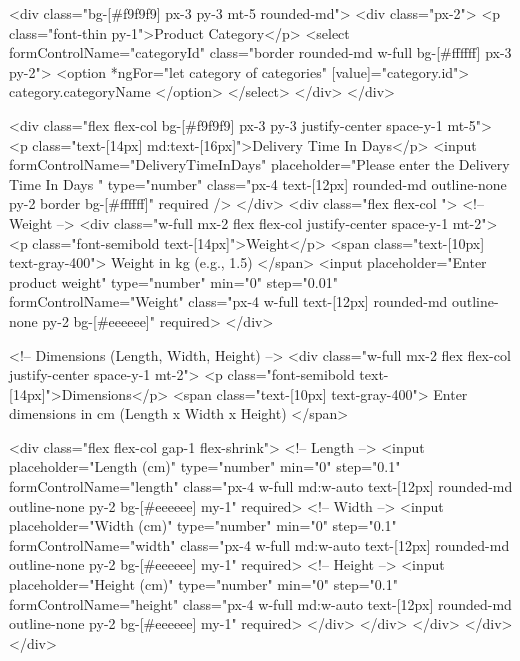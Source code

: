           <div class="bg-[#f9f9f9] px-3 py-3 mt-5 rounded-md">
            <div class="px-2">
              <p class="font-thin py-1">Product Category</p>
              <select formControlName="categoryId" class="border rounded-md w-full bg-[#ffffff] px-3 py-2">
                <option *ngFor="let category of categories" [value]="category.id">{{ category.categoryName }}</option>
              </select>
            </div>
          </div>
  
          <div class="flex flex-col bg-[#f9f9f9] px-3 py-3  justify-center space-y-1 mt-5">
            <p class="text-[14px] md:text-[16px]">Delivery Time In Days</p>
            <input formControlName="DeliveryTimeInDays" placeholder="Please enter the Delivery Time In Days " type="number" 
              class="px-4 text-[12px] rounded-md outline-none py-2 border bg-[#ffffff]" required />
          </div>
          <div class="flex  flex-col ">
            <!-- Weight -->
            <div class="w-full mx-2 flex flex-col justify-center space-y-1 mt-2">
              <p class="font-semibold text-[14px]">Weight</p>
              <span class="text-[10px] text-gray-400">
                Weight in kg (e.g., 1.5)
              </span>
              <input placeholder="Enter product weight" type="number" min="0" step="0.01" formControlName="Weight"
                class="px-4 w-full text-[12px] rounded-md outline-none py-2 bg-[#eeeeee]" required>
            </div>
        
        
            <!-- Dimensions (Length, Width, Height) -->
            <div class="w-full  mx-2 flex flex-col justify-center space-y-1 mt-2">
              <p class="font-semibold text-[14px]">Dimensions</p>
              <span class="text-[10px] text-gray-400">
                Enter dimensions in cm (Length x Width x Height)
              </span>
        
        
              <div class="flex flex-col  gap-1 flex-shrink">
                <!-- Length -->
                <input placeholder="Length (cm)" type="number" min="0" step="0.1" formControlName="length"
                  class="px-4 w-full md:w-auto text-[12px] rounded-md outline-none py-2 bg-[#eeeeee] my-1" required>
                <!-- Width -->
                <input placeholder="Width (cm)" type="number" min="0" step="0.1" formControlName="width"
                  class="px-4 w-full md:w-auto text-[12px] rounded-md outline-none py-2 bg-[#eeeeee] my-1" required>
                <!-- Height -->
                <input placeholder="Height (cm)" type="number" min="0" step="0.1" formControlName="height"
                  class="px-4 w-full md:w-auto text-[12px] rounded-md outline-none py-2 bg-[#eeeeee] my-1" required>
              </div>
            </div>
          </div>
        </div>
      </div>
              

